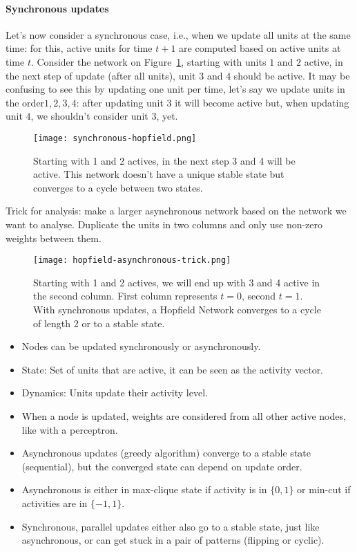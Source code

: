\documentclass[main]{subfiles}
\begin{document}
\paragraph{Synchronous updates}
Let's now consider a synchronous case, i.e., when we update all units at the same time: for this, active units for time $t+1$ are computed based on active units at time $t$.
Consider the network on Figure~\ref{fig:synchronous-hopfield}, starting with units $1$ and $2$ active, in the next step of update (after all units), unit $3$ and $4$ should be active. It may be confusing to see this by updating one unit per time, let's say we update units in the order${1, 2, 3, 4}$: after updating unit $3$ it will become active but, when updating unit $4$, we shouldn't consider unit $3$, yet.

\begin{figure}[H]
	\centering
	\texttt{[image: synchronous-hopfield.png]}
	\caption{Starting with 1 and 2 actives, in the next step 3 and 4 will be active. This network doesn't have a unique stable state but converges to a cycle between two states.}
	\label{fig:synchronous-hopfield}
\end{figure}

Trick for analysis: make a larger asynchronous network based on the network we want to analyse. Duplicate the units in two columns and only use non-zero weights between them.

\begin{figure}[H]
	\centering
	\texttt{[image: hopfield-asynchronous-trick.png]}
	\caption{Starting with 1 and 2 actives, we will end up with 3 and 4 active in the second column. First column represents $t=0$, second $t=1$. With synchronous updates, a Hopfield Network converges to a cycle of length 2 or to a stable state.}
\end{figure}

\begin{itemize}[noitemsep,nolistsep]
	\item Nodes can be updated synchronously or asynchronously.
	\item State: Set of units that are active, it can be seen as the activity vector.
	\item Dynamics: Units update their activity level.
	\item When a node is updated, weights are considered from all other active nodes, like with a perceptron.
	\item Asynchronous updates (greedy algorithm) converge to a stable state (sequential), but the converged state can depend on update order.
	\item Asynchronous is either in max-clique state if activity is in $\{0,1\}$ or min-cut if activities are in $\{-1,1\}$.
	\item Synchronous, parallel updates either also go to a stable state, just like asynchronous, or can get stuck in a pair of patterns (flipping or cyclic).
\end{itemize}
\end{document}
